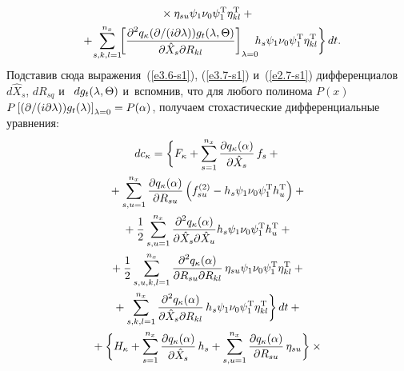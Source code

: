 \begin{multicols}{2}
\begin{multline*}
    {}\times \eta_{su} \psi_1\nu_0\psi_1^{\mathrm{T}} \eta_{kl}^{\mathrm{T}}+{}\\
{}+\!\sss_{s,k,l=1}^{n_x}\! \!\lk \fr{\partial^2 q_\kappa (\partial /(i\partial
    \la)) g_t (\la,\Theta)}
    {\partial \hat X_s \partial R_{kl}}\rk_{\la=0}
    \!\!\!h_s \psi_1\nu_0\psi_1^{\mathrm{T}}
     \eta_{kl}^{\mathrm{T}}\biggr\}\, dt.\hspace*{-6.3374pt}
    \end{multline*}
Подставив сюда выражения~(\ref{e3.6-s1}), (\ref{e3.7-s1}) и~(\ref{e2.7-s1})
дифференциалов $d\hat X_s$, $dR_{sq}$  и~ $dg_t (\lambda,\Theta)$ и~вспомнив,
что для любого полинома  $P(x)$ $P\lk (\partial /(i\partial
\la)) g_t(\la)\rk_{\la=0}\hm=P(\alp)$, получаем стохастические
дифференциальные уравнения:
\begin{multline*}
dc_\kappa =\biggl\{ F_\kappa +\sum\limits_{s=1}^{n_x}\displaystyle\frac{\displaystyle \partial q_\kappa
    (\alpha)\mathstrut}{\displaystyle \partial \hat X_s\mathstrut} \,f_s +{}\\
    {}+\sum\limits_{s,u=1}^{n_x} \displaystyle\frac{\displaystyle \partial
    q_\kappa (\alpha)\mathstrut}{\displaystyle \partial R_{su}\mathstrut}\left(
     f_{su}^{(2)} - h_s \psi_1\nu_0\psi_1^{\mathrm{T}} h_u^{\mathrm{T}}\right)+{}\\
{}+\displaystyle\frac{\displaystyle 1\mathstrut}{\displaystyle 2\mathstrut}\sum\limits_{s,u=1}^{n_x} \displaystyle\frac{\displaystyle \partial^2 q_\kappa (\alpha)\mathstrut}{\displaystyle \partial \hat X_s \partial \hat X_u\mathstrut}  h_s \psi_1\nu_0\psi_1^{\mathrm{T}} 
h_u^{\mathrm{T}} +{}\\
{}+ \displaystyle\frac{\displaystyle 1\mathstrut}{\displaystyle 2\mathstrut} \sum\limits_{s,u,k,l=1}^{n_x} 
\displaystyle\frac{\displaystyle \partial^2 q_\kappa (\alpha)\mathstrut}{\displaystyle \partial R_{su}\partial R_{kl}\mathstrut}\,
    \eta_{su} \psi_1\nu_0\psi_1^{\mathrm{T}} \eta_{kl}^{\mathrm{T}}+{}\\
    {}+\sum\limits_{s,k,l=1}^{n_x} \displaystyle\frac{\displaystyle \partial^2 q_\kappa (\alpha)\mathstrut}{\displaystyle \partial \hat X_s \partial R_{kl}\mathstrut}\, h_s \psi_1\nu_0\psi_1^{\mathrm{T}} \eta_{kl}^{\mathrm{T}}\biggr\}\, dt +{}\\
{}+\biggl\{ H_\kappa +
    \sum\limits_{s=1}^{n_x} \displaystyle\frac{\displaystyle \partial q_\kappa (\alpha)\mathstrut}{\displaystyle \partial \hat X_s\mathstrut}\,h_s +
\sum\limits_{s,u=1}^{n_x} \displaystyle\frac{\displaystyle \partial q_\kappa (\alpha)\mathstrut}{\displaystyle \partial R_{su}\mathstrut} \,\eta_{su}
\biggr\}\times{}
\end{multline*}


\end{multicols}
